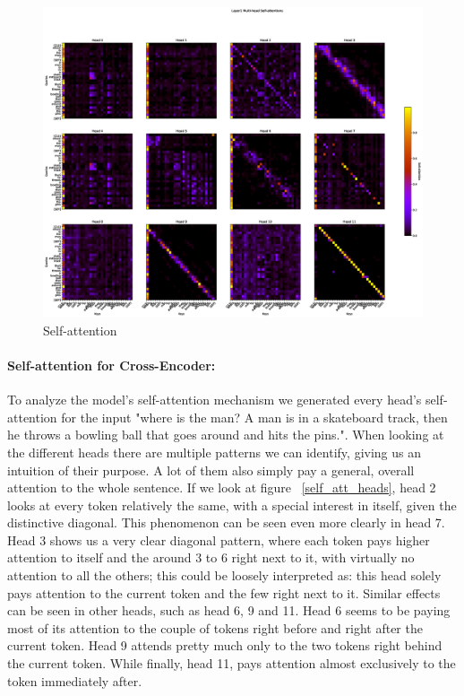 \documentclass[runningheads]{llncs}
\begin{document}
\begin{figure}
  \centering
  \includegraphics[width=\textwidth, clip=true, trim = 70mm 25mm 130mm 45mm]{self_att_heads.eps}
  \caption{Self-attention} \label{self_att_heads}
  \label{img:self_attention}
\end{figure}

\paragraph{Self-attention for Cross-Encoder:} To analyze the model's self-attention mechanism we generated every head's self-attention for the input "where is the man? A man is in a skateboard track, then he throws a bowling ball that goes around and hits the pins.". When looking at the different heads there are multiple patterns we can identify, giving us an intuition of their purpose. A lot of them also simply pay a general, overall attention to the whole sentence. If we look at figure ~\ref{self_att_heads}, head 2 looks at every token relatively the same, with a special interest in itself, given the distinctive diagonal. This phenomenon can be seen even more clearly in head 7. Head 3 shows us a very clear diagonal pattern, where each token pays higher attention to itself and the around 3 to 6 right next to it, with virtually no attention to all the others; this could be loosely interpreted as: this head solely pays attention to the current token and the few right next to it. Similar effects can be seen in other heads, such as head 6, 9 and 11. Head 6 seems to be paying most of its attention to the couple of tokens right before and right after the current token. Head 9 attends pretty much only to the two tokens right behind the current token. While finally, head 11, pays attention almost exclusively to the token immediately after.
\end{document}
